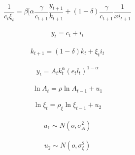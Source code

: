 \documentclass[12pt]{article}
\begin{document}
	\begin{equation}
	\dfrac{1}{c_t\xi_t}=\beta[\alpha\dfrac{\gamma}{c_{t+1}}\dfrac{y_{t+1}}{k_{t+1}}+(1-\delta) \dfrac{\gamma}{c_{t+1}} \dfrac{1}{xi_{t+1}}
	\end{equation}\\

\begin{equation}
	y_t=c_t+i_t
\end{equation}\\

\begin{equation}
	k_{t+1}=(1-\delta)k_t+\xi_ti_t
\end{equation}\\

\begin{equation}
	y_t=A_t k_t^\alpha (e_tl_t)^{1-\alpha}
\end{equation}\\

\begin{equation}
	\ln A_t=\rho \ln A_{t-1}+u_1
\end{equation}\\

\begin{equation}
		\ln \xi_t=\rho_\xi \ln \xi_{t-1}+u_2
\end{equation}\\

\begin{equation}
	u_1 \sim N(o,\sigma_A^2) \nonumber
\end{equation}\\

\begin{equation}
	u_2 \sim N(o,\sigma_\xi^2) \nonumber
\end{equation}\\
\end{document}
